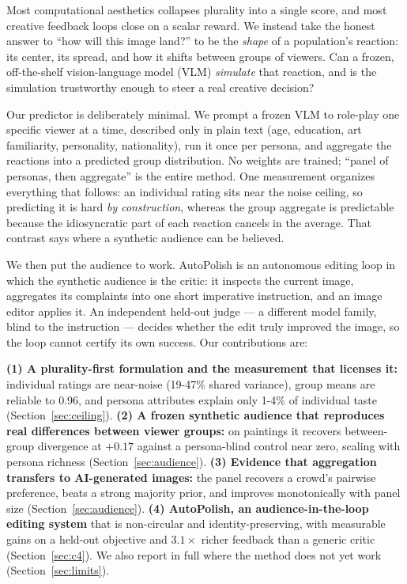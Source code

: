 \documentclass{article}
\begin{document}
Most computational aesthetics collapses plurality into a single score, and most creative feedback loops close on a scalar reward. We instead take the honest answer to ``how will this image land?'' to be the \emph{shape} of a population's reaction: its center, its spread, and how it shifts between groups of viewers. Can a frozen, off-the-shelf vision-language model (VLM) \emph{simulate} that reaction, and is the simulation trustworthy enough to steer a real creative decision?

Our predictor is deliberately minimal. We prompt a frozen VLM to role-play one specific viewer at a time, described only in plain text (age, education, art familiarity, personality, nationality), run it once per persona, and aggregate the reactions into a predicted group distribution. No weights are trained; ``panel of personas, then aggregate'' is the entire method. One measurement organizes everything that follows: an individual rating sits near the noise ceiling, so predicting it is hard \emph{by construction}, whereas the group aggregate is predictable because the idiosyncratic part of each reaction cancels in the average. That contrast says where a synthetic audience can be believed.

We then put the audience to work. AutoPolish is an autonomous editing loop in which the synthetic audience is the critic: it inspects the current image, aggregates its complaints into one short imperative instruction, and an image editor applies it. An independent held-out judge --- a different model family, blind to the instruction --- decides whether the edit truly improved the image, so the loop cannot certify its own success. Our contributions are:

\textbf{(1) A plurality-first formulation and the measurement that licenses it:} individual ratings are near-noise (19-47\% shared variance), group means are reliable to 0.96, and persona attributes explain only 1-4\% of individual taste (Section~\ref{sec:ceiling}). \textbf{(2) A frozen synthetic audience that reproduces real differences between viewer groups:} on paintings it recovers between-group divergence at $+0.17$ against a persona-blind control near zero, scaling with persona richness (Section~\ref{sec:audience}). \textbf{(3) Evidence that aggregation transfers to AI-generated images:} the panel recovers a crowd's pairwise preference, beats a strong majority prior, and improves monotonically with panel size (Section~\ref{sec:audience}). \textbf{(4) AutoPolish, an audience-in-the-loop editing system} that is non-circular and identity-preserving, with measurable gains on a held-out objective and $3.1\times$ richer feedback than a generic critic (Section~\ref{sec:c4}). We also report in full where the method does not yet work (Section~\ref{sec:limits}).
\end{document}
